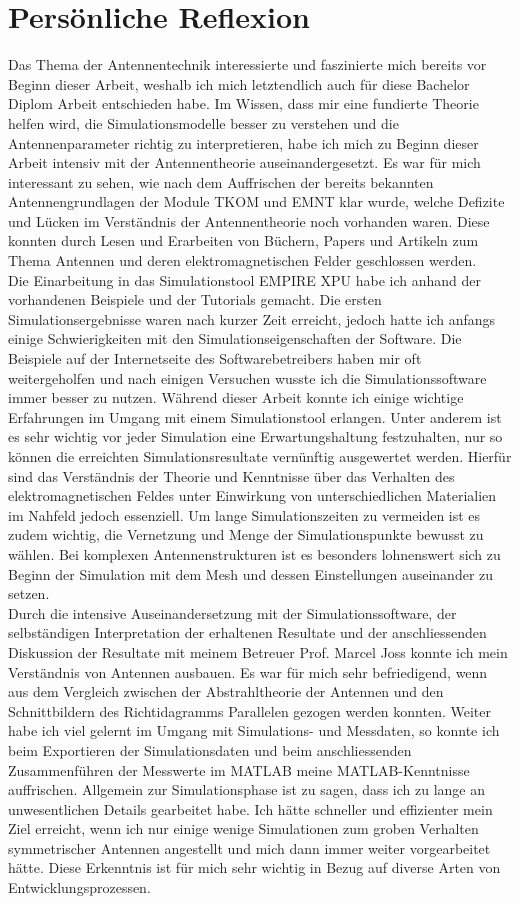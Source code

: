 \section{Persönliche Reflexion}
Das Thema der Antennentechnik interessierte und faszinierte mich bereits vor Beginn dieser Arbeit, weshalb ich mich letztendlich auch für diese Bachelor Diplom Arbeit entschieden habe. Im Wissen, dass mir eine fundierte Theorie helfen wird, die Simulationsmodelle besser zu verstehen und die Antennenparameter richtig zu interpretieren, habe ich mich zu Beginn dieser Arbeit intensiv mit der Antennentheorie auseinandergesetzt. Es war für mich interessant zu sehen, wie nach dem Auffrischen der bereits bekannten Antennengrundlagen der Module TKOM und EMNT klar wurde, welche Defizite und Lücken im Verständnis der Antennentheorie noch vorhanden waren. Diese konnten durch Lesen und Erarbeiten von Büchern, Papers und Artikeln zum Thema Antennen und deren elektromagnetischen Felder geschlossen werden. \\ 
Die Einarbeitung in das Simulationstool EMPIRE XPU habe ich anhand der vorhandenen Beispiele und der Tutorials gemacht. Die ersten Simulationsergebnisse waren nach kurzer Zeit erreicht, jedoch hatte ich anfangs einige Schwierigkeiten mit den Simulationseigenschaften der Software. Die Beispiele auf der Internetseite des Softwarebetreibers haben mir oft weitergeholfen und nach einigen Versuchen wusste ich die Simulationssoftware immer besser zu nutzen. Während dieser Arbeit konnte ich einige wichtige Erfahrungen im Umgang mit einem Simulationstool erlangen. Unter anderem ist es sehr wichtig vor jeder Simulation eine Erwartungshaltung festzuhalten, nur so können die erreichten Simulationsresultate vernünftig ausgewertet werden. Hierfür sind das Verständnis der Theorie und Kenntnisse über das Verhalten des elektromagnetischen Feldes unter Einwirkung von unterschiedlichen Materialien im Nahfeld jedoch essenziell. Um lange Simulationszeiten zu vermeiden ist es zudem wichtig, die Vernetzung und Menge der Simulationspunkte bewusst zu wählen. Bei komplexen Antennenstrukturen ist es besonders lohnenswert sich zu Beginn der Simulation mit dem Mesh und dessen Einstellungen auseinander zu setzen. \\
Durch die intensive Auseinandersetzung mit der Simulationssoftware, der selbständigen Interpretation der erhaltenen Resultate und der anschliessenden Diskussion der Resultate mit meinem Betreuer Prof. Marcel Joss konnte ich mein Verständnis von Antennen ausbauen. Es war für mich sehr befriedigend, wenn aus dem Vergleich zwischen der Abstrahltheorie der Antennen und den Schnittbildern des Richtidagramms Parallelen gezogen werden konnten. Weiter habe ich viel gelernt im Umgang mit Simulations- und Messdaten, so konnte ich beim Exportieren der Simulationsdaten und beim anschliessenden Zusammenführen der Messwerte im MATLAB meine MATLAB-Kenntnisse auffrischen. Allgemein zur Simulationsphase ist zu sagen, dass ich zu lange an unwesentlichen Details gearbeitet habe. Ich hätte schneller und effizienter mein Ziel erreicht, wenn ich nur einige wenige Simulationen zum groben Verhalten symmetrischer Antennen angestellt und mich dann immer weiter vorgearbeitet hätte. Diese Erkenntnis ist für mich sehr wichtig in Bezug auf diverse Arten von Entwicklungsprozessen.\\
